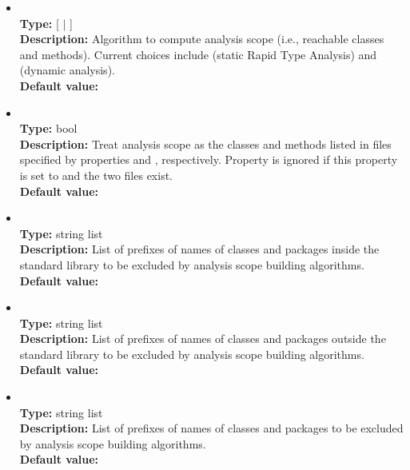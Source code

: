 \begin{itemize}
\item
{} \\
{\bf Type:} [ $|$ ] \\
{\bf Description:} Algorithm to compute analysis scope (i.e., reachable classes and methods).  Current choices include  (static Rapid Type Analysis) and  (dynamic analysis). \\
{\bf Default value:} 

\item
{} \\
{\bf Type:} bool \\
{\bf Description:} Treat analysis scope as the classes and methods listed in files specified by properties  and , respectively. Property  is ignored if this property is set to  and the two files exist. \\
{\bf Default value:}  


\item
{} \\
{\bf Type:} string list \\
{\bf Description:} List of prefixes of names of classes and packages inside the standard library to be excluded by analysis scope building algorithms. \\
{\bf Default value:}  

\item
{} \\
{\bf Type:} string list \\
{\bf Description:} List of prefixes of names of classes and packages outside the standard library to be excluded by analysis scope building algorithms. \\
{\bf Default value:} 

\item
{} \\
{\bf Type:} string list \\
{\bf Description:} List of prefixes of names of classes and packages to be excluded by analysis scope building algorithms. \\
{\bf Default value:} 
\end{itemize}

